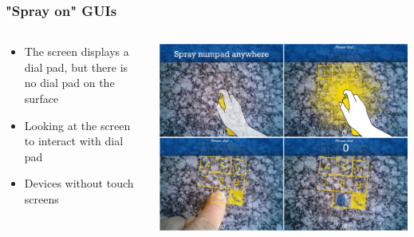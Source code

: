 \documentclass{beamer}
\begin{document}
\begin{frame}
	\frametitle{"Spray on" GUIs}	
	\begin{columns}
	\begin{column}{0.45\textwidth}
	\begin{itemize}
		\item The screen displays a dial pad, but there is no dial pad on the surface
		\item Looking at the screen to interact with dial pad
		\item Devices without touch screens
	\end{itemize}		
	\end{column}
	\begin{column}{0.55\textwidth}
	\includegraphics[width=\textwidth]{../Sample_paper/images/numpad}
	\end{column}
	\end{columns}
\end{frame}
\end{document}
